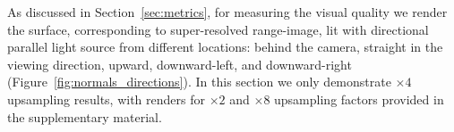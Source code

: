 As discussed in Section~\ref{sec:metrics},
for measuring the visual quality we render the surface, corresponding to super-resolved range-image, lit with directional parallel light source from different locations: behind the camera, straight in the viewing direction, upward, downward-left, and downward-right (Figure~\ref{fig:normals_directions}).
In this section we only demonstrate $\times 4$ upsampling results,
with renders for $\times 2$ and $\times 8$ upsampling factors provided 
in the supplementary material.





